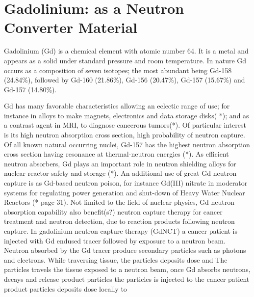 \section{Gadolinium: as a Neutron Converter Material}


Gadolinium (Gd) is a chemical element with atomic number 64. It is a metal and appears as a solid under standard pressure and room temperature. In nature Gd occurs as a composition of seven isotopes; the most abundant being Gd-158 (24.84\%), followed by Gd-160 (21.86\%), Gd-156 (20.47\%), Gd-157 (15.67\%) and Gd-157 (14.80\%).

Gd has many favorable characteristics allowing an eclectic range of use; for instance in alloys to make magnets, electronics and data storage disks( *); and as a contrast agent in MRI, to diagnose cancerous tumors(*).
Of particular interest is its high neutron absorption cross section, high probability of neutron capture. Of all known natural occurring nuclei, Gd-157 has the highest neutron absorption cross section having resonance at thermal-neutron energies (*). As efficient neutron absorbers, Gd plays an important role in neutron shielding alloys for nuclear reactor safety and storage (*). An additional use of great Gd neutron capture is as Gd-based neutron poison, for instance Gd(III) nitrate in moderator systems for regulating power generation and shut-down of Heavy Water Nuclear Reactors (* page 31).
Not limited to the field of nuclear physics, Gd neutron absorption capability also benefit(s?) neutron capture therapy for cancer treatment and neutron detection, due to reaction products following neutron capture.  In gadolinium neutron capture therapy (GdNCT) a cancer patient is injected with Gd endused tracer followed by exposure to a neutron beam. Neutron absorbed by the Gd tracer produce secondary particles such as photons and electrons. While traversing tissue, the particles deposits dose and The particles travels the tissue exposed to a neutron beam, once Gd absorbs neutrons, decays and release product particles the particles  is injected to the cancer patient product particles deposits dose locally to

